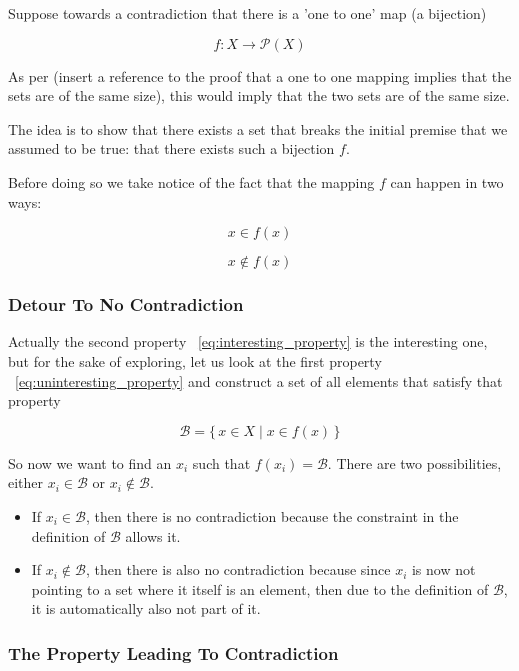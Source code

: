 \documentclass[11pt,a4paper]{article}
\begin{document}
Suppose towards a contradiction that there is a 'one to one' map (a bijection)

\[
  f: X \to \mathcal{P}(X)
\]

As per (insert a
reference to the proof that a one to one mapping implies that the sets are of the same size), this
would imply that the two sets are of the same size.

The idea is to show that there exists a set that breaks the initial premise that we assumed to
be true: that there exists such a bijection $f$.

Before doing so we take notice of the fact that the mapping $f$ can happen in two ways:

\begin{equation}
    x \in f(x)
    \label{eq:uninteresting_property}
\end{equation}

\begin{equation}
    x \notin f(x)
    \label{eq:interesting_property}
\end{equation}

\subsubsection{Detour To No Contradiction}

Actually the second property ~\eqref{eq:interesting_property} is the interesting one, but for the sake of exploring,
let us look at the first property ~\eqref{eq:uninteresting_property} and construct a set of all elements that satisfy that property

\[
\mathcal{B} = \{\, x \in X \mid x \in f(x) \,\}
\]

So now we want to find an $x_i$ such that $f(x_i) = \mathcal{B}$. There are two possibilities, either
$x_i \in \mathcal{B}$ or $x_i \notin \mathcal{B}$.

\begin{itemize}
  \item If $x_i \in \mathcal{B}$, then there is no contradiction because the constraint in the definition
        of $\mathcal{B}$ allows it.
  \item If $x_i \notin \mathcal{B}$, then there is also no contradiction because since $x_i$ is now not
        pointing to a set where it itself is an element, then due to the definition of $\mathcal{B}$, it
        is automatically also not part of it.
\end{itemize}


\subsubsection{The Property Leading To Contradiction}
\end{document}
